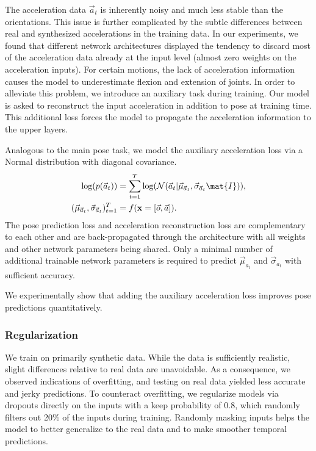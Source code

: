 \documentclass[acmtog]{acmart}
\begin{document}
The acceleration data  $\vec{a}_t$ is inherently noisy and much less stable than the orientations. This issue is further complicated by the subtle differences between real and synthesized accelerations in the training data. In our experiments, we found that different network architectures displayed the tendency to discard most of the acceleration data already at the input level (almost zero weights on the acceleration inputs). 
For certain motions, the lack of acceleration information causes the model to underestimate flexion and extension of joints. In order to alleviate this problem, we introduce an auxiliary task during training. Our model is asked to reconstruct the input acceleration in addition to pose at training time. This additional loss forces the model to propagate the acceleration information to the upper layers.

Analogous to the main pose task, we model the auxiliary acceleration loss via a Normal distribution with diagonal covariance. 
\begin{align}
	\begin{split}
		\text{log}( p(\vec{a}_t)) &= \sum_{t=1}^T \text{log} (\mathcal{N}(\vec{a}_t | \vec{\mu}_{\vec{a}_t}, \vec{\sigma}_{\vec{a}_t}\mat{I})), \\
		(\vec{\mu}_{\vec{a}_t}, \vec{\sigma}_{\vec{a}_t})_{t=1}^{T} &= f(\xin = [\vec{o}, \vec{a}]).
		\label{eq:log_prob_acc}
	\end{split}
\end{align}
The pose prediction loss  and acceleration reconstruction loss  are complementary to each other and are back-propagated through the architecture with all weights and other network parameters being shared. Only a minimal number of additional trainable network parameters is required to predict $\vec{\mu}_{a_t}$ and $\vec{\sigma}_{a_t}$ with sufficient accuracy.

We experimentally show that adding the auxiliary acceleration loss improves pose predictions quantitatively.

\subsubsection{Regularization}
We train on primarily synthetic data. While the data is sufficiently realistic, slight differences relative to real data are unavoidable. As a consequence, we observed indications of overfitting, and testing on real data yielded less accurate and jerky predictions. To counteract overfitting, we regularize models via dropouts directly on the inputs with a keep probability of $0.8$, which randomly filters out 20\% of the inputs during training. Randomly masking inputs helps the model to better generalize to the real data and to make smoother temporal predictions.
\end{document}

